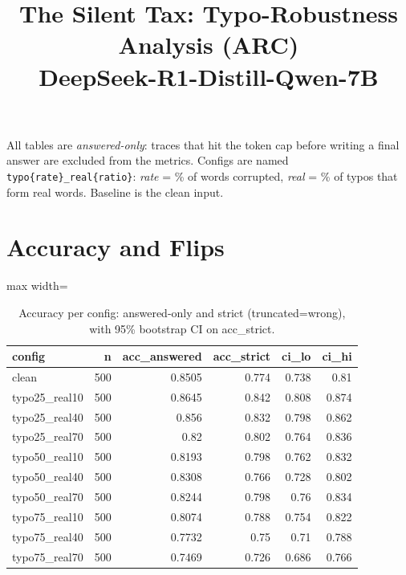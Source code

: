 \documentclass[11pt]{article}
\title{The Silent Tax: Typo-Robustness Analysis (ARC)\\\large DeepSeek-R1-Distill-Qwen-7B}
\date{}
\begin{document}
\maketitle
\noindent All tables are \emph{answered-only}: traces that hit the token cap before writing a final answer are excluded from the metrics. Configs are named \texttt{typo\{rate\}\_real\{ratio\}}: \emph{rate} = \% of words corrupted, \emph{real} = \% of typos that form real words. Baseline is the clean input.

\section*{Accuracy and Flips}
\begin{table}[H]
\centering
\caption{Accuracy per config: answered-only and strict (truncated=wrong), with 95\% bootstrap CI on acc\_strict.}
\small
\begin{adjustbox}{max width=\textwidth}
\begin{tabular}{lrrrrr}
\toprule
\textbf{config} & \textbf{n} & \textbf{acc\_answered} & \textbf{acc\_strict} & \textbf{ci\_lo} & \textbf{ci\_hi} \\
\midrule
clean & 500 & 0.8505 & 0.774 & 0.738 & 0.81 \\
typo25\_real10 & 500 & 0.8645 & 0.842 & 0.808 & 0.874 \\
typo25\_real40 & 500 & 0.856 & 0.832 & 0.798 & 0.862 \\
typo25\_real70 & 500 & 0.82 & 0.802 & 0.764 & 0.836 \\
typo50\_real10 & 500 & 0.8193 & 0.798 & 0.762 & 0.832 \\
typo50\_real40 & 500 & 0.8308 & 0.766 & 0.728 & 0.802 \\
typo50\_real70 & 500 & 0.8244 & 0.798 & 0.76 & 0.834 \\
typo75\_real10 & 500 & 0.8074 & 0.788 & 0.754 & 0.822 \\
typo75\_real40 & 500 & 0.7732 & 0.75 & 0.71 & 0.788 \\
typo75\_real70 & 500 & 0.7469 & 0.726 & 0.686 & 0.766 \\
\bottomrule
\end{tabular}
\end{adjustbox}
\end{table}
\end{document}
